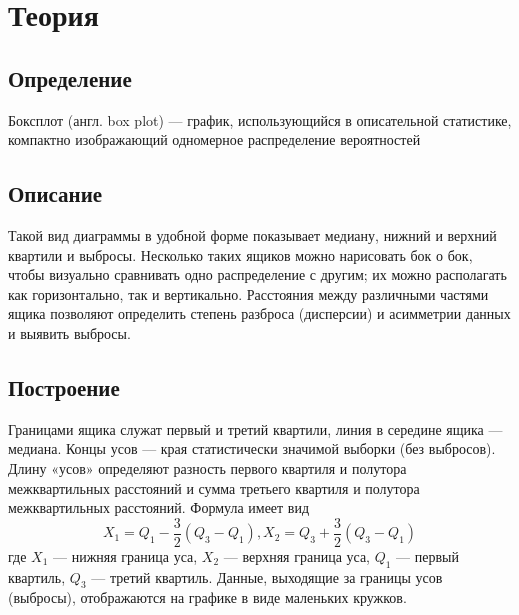 \documentclass[a4paper,12pt]{article} %
\begin{document}
\section{Теория}
\subsection{Определение}
	\noindent Боксплот (англ. box plot) — график, использующийся в описательной статистике, компактно изображающий одномерное распределение вероятностей
	
	\subsection{Описание}
	\noindent Такой вид диаграммы в удобной форме показывает медиану, нижний и верхний квартили и выбросы. Несколько таких ящиков можно нарисовать бок о бок, чтобы визуально сравнивать одно распределение с другим; их можно располагать как горизонтально, так и вертикально. Расстояния между различными частями ящика позволяют определить степень разброса (дисперсии) и асимметрии данных и выявить выбросы.
	
	\subsection{Построение}
	\noindent Границами ящика служат первый и третий квартили, линия в середине ящика — медиана. Концы усов — края статистически значимой выборки (без выбросов). Длину «усов» определяют разность первого квартиля и полутора межквартильных расстояний и сумма третьего квартиля и полутора межквартильных расстояний. Формула имеет вид
	\begin{equation}
	\label{mouns}
	{X_1 = Q_1-} \frac{3}{2}{(Q_3 - Q_1)},   {X_2 = Q_3+} \frac{3}{2}{(Q_3 - Q_1)}
	\end{equation}
	где $X_1$ — нижняя граница уса, $X_2$ — верхняя граница уса, $Q_1$ — первый квартиль, $Q_3$ — третий квартиль. Данные, выходящие за границы усов (выбросы), отображаются на графике в виде маленьких кружков.
	
	
\end{document}
